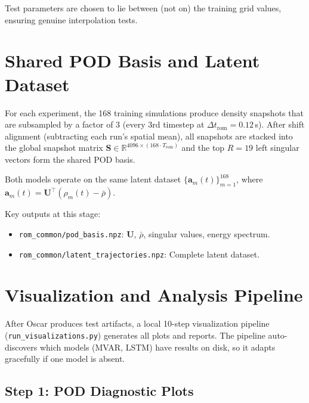 \documentclass[11pt]{article}
\newcommand{\R}{\mathbb{R}}
\newcommand{\ba}{\mathbf{a}}
\newcommand{\bU}{\mathbf{U}}
\begin{document}
Test parameters are chosen to lie between (not on) the training grid
values, ensuring genuine interpolation tests.


\section{Shared POD Basis and Latent Dataset}
\label{sec:pod}

For each experiment, the 168 training simulations produce density
snapshots that are subsampled by a factor of 3 (every 3rd timestep at
$\Delta t_{\text{rom}} = 0.12$\,s).  After shift alignment (subtracting
each run's spatial mean), all snapshots are stacked into the global
snapshot matrix $\mathbf{S}\in\R^{4096\times (168 \cdot T_{\text{rom}})}$ and
the top $R=19$ left singular vectors form the shared POD basis.

Both models operate on the same latent dataset
$\{\ba_m(t)\}_{m=1}^{168}$, where
$\ba_m(t) = \bU^\top(\rho_m(t) - \bar\rho)$.

Key outputs at this stage:
\begin{itemize}[nosep]
    \item \texttt{rom\_common/pod\_basis.npz}: $\bU$, $\bar\rho$, singular values, energy spectrum.
    \item \texttt{rom\_common/latent\_trajectories.npz}: Complete latent dataset.
\end{itemize}


\section{Visualization and Analysis Pipeline}
\label{sec:viz}

After Oscar produces test artifacts, a local 10-step visualization
pipeline (\texttt{run\_visualizations.py}) generates all plots and
reports.  The pipeline auto-discovers which models (MVAR, LSTM) have
results on disk, so it adapts gracefully if one model is absent.

\subsection{Step 1: POD Diagnostic Plots}
\end{document}
